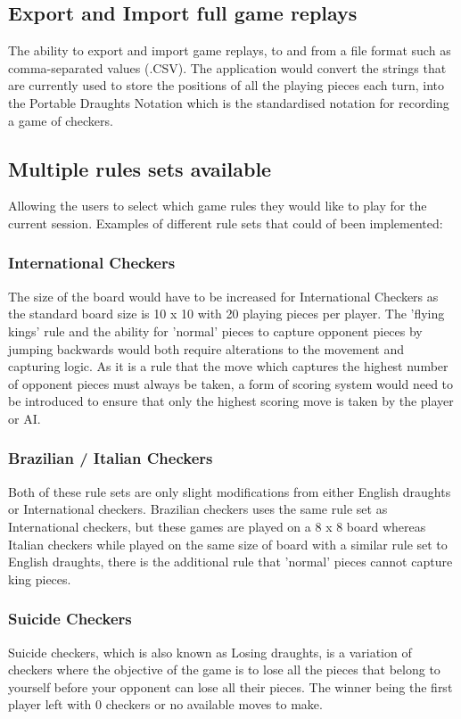 \documentclass[10pt, a4paper]{article}
\begin{document}
    \subsection{Export and Import full game replays}
    The ability to export and import game replays, to and from a file format such as comma-separated values (.CSV).     
    The application would convert the strings that are currently used to store the positions of all the playing pieces each turn, into the Portable Draughts Notation which is the standardised notation for recording a game of checkers. 
    
       
    \subsection{Multiple rules sets available}
    Allowing the users to select which game rules they would like to play for the current session. Examples of different rule sets that could of been implemented:
     
    
    	\subsubsection{International Checkers}
    	The size of the board would have to be increased for International Checkers as the standard board size is 10 x 10 with 20 playing pieces per player. The 'flying kings' rule and the ability for 'normal' pieces to capture opponent pieces by jumping backwards would both require alterations to the movement and capturing logic.    
    	As it is a rule that the move which captures the highest number of opponent pieces must always be taken, a form of scoring system would need to be introduced to ensure that only the highest scoring move is taken by the player or AI.
    	
    
    	\subsubsection{Brazilian / Italian Checkers}
   		Both of these rule sets are only slight modifications from either English draughts or International checkers. Brazilian checkers uses the same rule set as International checkers, but these games are played on a 8 x 8 board whereas Italian checkers while played on the same size of board with a similar rule set to English draughts, there is the additional rule that 'normal' pieces cannot capture king pieces.
   		
    
    	\subsubsection{Suicide Checkers}
    	Suicide checkers, which is also known as Losing draughts, is a variation of checkers where the objective of the game is to lose all the pieces that belong to yourself before your opponent can lose all their pieces. The winner being the first player left with 0 checkers or no available moves to make. 
    	
\end{document}
